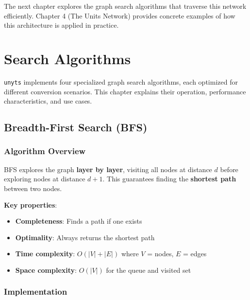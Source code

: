 \documentclass[11pt,a4paper]{report}
\begin{document}
The next chapter explores the graph search algorithms that traverse this network efficiently. Chapter 4 (The Units Network) provides concrete examples of how this architecture is applied in practice.


\chapter{Search Algorithms}

\texttt{unyts} implements four specialized graph search algorithms, each optimized for different conversion scenarios. This chapter explains their operation, performance characteristics, and use cases.

\section{Breadth-First Search (BFS)}

\subsection{Algorithm Overview}

BFS explores the graph \textbf{layer by layer}, visiting all nodes at distance $d$ before exploring nodes at distance $d+1$. This guarantees finding the \textbf{shortest path} between two nodes.

\textbf{Key properties}:
\begin{itemize}[leftmargin=*]
  \item \textbf{Completeness}: Finds a path if one exists
  \item \textbf{Optimality}: Always returns the shortest path
  \item \textbf{Time complexity}: $O(|V| + |E|)$ where $V$ = nodes, $E$ = edges
  \item \textbf{Space complexity}: $O(|V|)$ for the queue and visited set
\end{itemize}

\subsection{Implementation}
\end{document}

